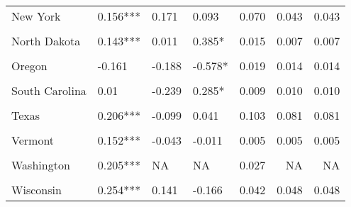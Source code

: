 \begin{table}[!h]
\begin{tabular}[t]{llllrrr}
New York & 0.156*** & 0.171 & 0.093 & 0.070 & 0.043 & 0.043\\
\cellcolor{gray!10}{North Carolina} & \cellcolor{gray!10}{0.137} & \cellcolor{gray!10}{0.86**} & \cellcolor{gray!10}{1.763***} & \cellcolor{gray!10}{0.012} & \cellcolor{gray!10}{0.014} & \cellcolor{gray!10}{0.014}\\
North Dakota & 0.143*** & 0.011 & 0.385* & 0.015 & 0.007 & 0.007\\
\cellcolor{gray!10}{Ohio} & \cellcolor{gray!10}{0.177***} & \cellcolor{gray!10}{-0.341**} & \cellcolor{gray!10}{-0.026} & \cellcolor{gray!10}{0.067} & \cellcolor{gray!10}{0.068} & \cellcolor{gray!10}{0.068}\\
Oregon & -0.161 & -0.188 & -0.578* & 0.019 & 0.014 & 0.014\\
\cellcolor{gray!10}{Pennsylvania} & \cellcolor{gray!10}{0.147***} & \cellcolor{gray!10}{-0.589***} & \cellcolor{gray!10}{-0.531***} & \cellcolor{gray!10}{0.055} & \cellcolor{gray!10}{0.061} & \cellcolor{gray!10}{0.061}\\
South Carolina & 0.01 & -0.239 & 0.285* & 0.009 & 0.010 & 0.010\\
\cellcolor{gray!10}{South Dakota} & \cellcolor{gray!10}{0.156***} & \cellcolor{gray!10}{-0.093} & \cellcolor{gray!10}{-0.008} & \cellcolor{gray!10}{0.016} & \cellcolor{gray!10}{0.011} & \cellcolor{gray!10}{0.011}\\
Texas & 0.206*** & -0.099 & 0.041 & 0.103 & 0.081 & 0.081\\
\cellcolor{gray!10}{Utah} & \cellcolor{gray!10}{0.075} & \cellcolor{gray!10}{-0.263} & \cellcolor{gray!10}{0.068} & \cellcolor{gray!10}{0.004} & \cellcolor{gray!10}{0.004} & \cellcolor{gray!10}{0.004}\\
Vermont & 0.152*** & -0.043 & -0.011 & 0.005 & 0.005 & 0.005\\
\cellcolor{gray!10}{Virginia} & \cellcolor{gray!10}{0.137***} & \cellcolor{gray!10}{NA} & \cellcolor{gray!10}{NA} & \cellcolor{gray!10}{0.014} & \cellcolor{gray!10}{NA} & \cellcolor{gray!10}{NA}\\
Washington & 0.205*** & NA & NA & 0.027 & NA & NA\\
\cellcolor{gray!10}{West Virginia} & \cellcolor{gray!10}{0.143**} & \cellcolor{gray!10}{0.041} & \cellcolor{gray!10}{0.327**} & \cellcolor{gray!10}{0.006} & \cellcolor{gray!10}{0.005} & \cellcolor{gray!10}{0.005}\\
Wisconsin & 0.254*** & 0.141 & -0.166 & 0.042 & 0.048 & 0.048\\
\bottomrule
\end{tabular}
\end{table}
